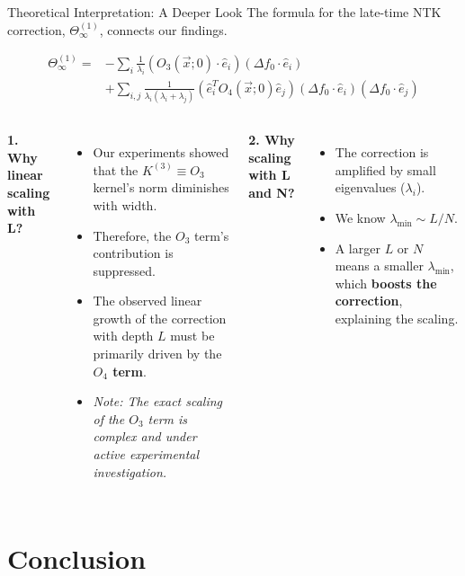 \documentclass{beamer}
\begin{document}
\begin{frame}{Theoretical Interpretation: A Deeper Look}
The formula for the late-time NTK correction, $\Theta^{(1)}_\infty$, connects our findings.
\begin{theorem}
\begin{align*}
\Theta^{(1)}_\infty = & -\sum_{i}\frac{1}{\lambda_{i}}(O_{3}(\vec{x};0)\cdot\hat{e}_{i})(\Delta f_{0}\cdot\hat{e}_{i}) \\
& + \sum_{i,j}\frac{1}{\lambda_{i}(\lambda_{i}+\lambda_{j})}(\hat{e}_{i}^{T}O_{4}(\vec{x};0)\hat{e}_{j})(\Delta f_{0}\cdot \hat{e}_{i})(\Delta f_{0}\cdot \hat{e}_{j})
\end{align*}
\end{theorem}

\begin{columns}
\textbf{1. Why linear scaling with L?}
\begin{itemize}
    \item Our experiments showed that the $K^{(3)} \equiv O_3$ kernel's norm diminishes with width.
    \item Therefore, the $O_3$ term's contribution is suppressed.
    \item The observed linear growth of the correction with depth $L$ must be primarily driven by the \textbf{$O_4$ term}.
    \item \textit{Note: The exact scaling of the $O_3$ term is complex and under active experimental investigation.}
\end{itemize}

\textbf{2. Why scaling with L and N?}
\begin{itemize}
    \item The correction is amplified by small eigenvalues ($\lambda_i$).
    \item We know $\lambda_{\min} \sim L/N$.
    \item A larger $L$ or $N$ means a smaller $\lambda_{\min}$, which \textbf{boosts the correction}, explaining the scaling.
\end{itemize}
\end{columns}

\end{frame}


\section{Conclusion}
\end{document}
